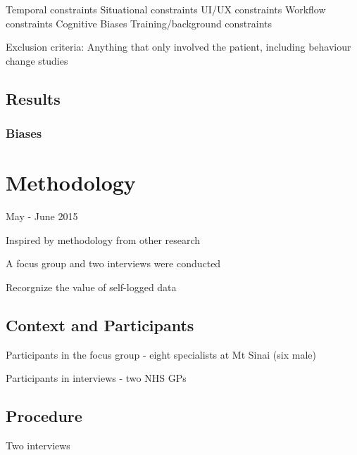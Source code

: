 \documentclass{sigchi}
\begin{document}
Temporal constraints
Situational constraints
UI/UX constraints 
Workflow constraints
Cognitive Biases
Training/background constraints

Exclusion criteria:
  Anything that only involved the patient, including behaviour change studies

\subsection{Results}


\subsubsection{Biases}







\section{Methodology}

May - June 2015

Inspired by methodology from other research

A focus group and two interviews were conducted

Recorgnize the value of self-logged data



\subsection{Context and Participants}

Participants in the focus group - eight specialists at Mt Sinai (six male)

Participants in interviews - two NHS GPs

\subsection{Procedure}

Two interviews
\end{document}
